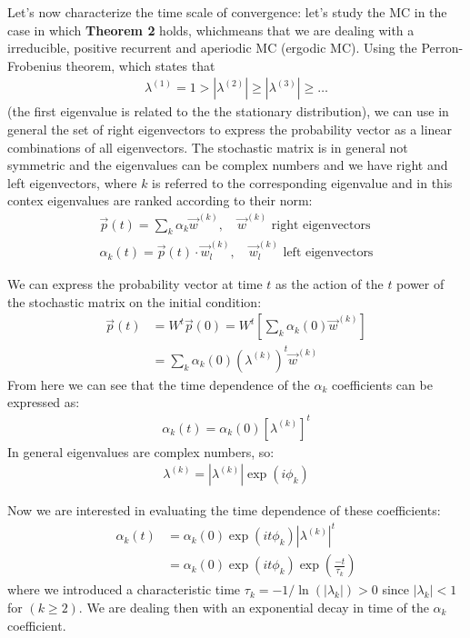 \documentclass[\main/main.tex]{subfiles}
\begin{document}
Let's now characterize the time scale of convergence: let's study the MC in the case in which \textbf{Theorem 2} holds, whichmeans that we are dealing with a irreducible, positive recurrent and aperiodic MC (ergodic MC).
Using the Perron-Frobenius theorem, which states that
\begin{eqnarray}
\lambda^{(1)}=1>|\lambda^{(2)}|\geq|\lambda^{(3)}|\geq\dots
\end{eqnarray}
(the first eigenvalue is related to the the stationary distribution), we can use in general the set of right eigenvectors to express the probability vector as a linear combinations of all eigenvectors. The stochastic matrix is in general not symmetric and the eigenvalues can be complex numbers and we have right and left eigenvectors, where $k$ is referred to the corresponding eigenvalue and in this contex eigenvalues are ranked according to their norm:
\begin{eqnarray}
\Vec{p}(t)=\sum_k \alpha_k \Vec{w}^{(k)}, \quad \vec{w}^{(k)}\,\, \text{right eigenvectors} \\
\alpha_k(t)=\Vec{p}(t)\cdot\Vec{w}_l^{(k)}, \quad \Vec{w}_l^{(k)}\,\,\text{left eigenvectors}
\end{eqnarray}

We can express the probability vector at time $t$ as the action of the $t$ power of the stochastic matrix on the initial condition:
\begin{align}
    \Vec{p}(t) &=W^t \Vec{p}(0)=W^t[\sum_k \alpha_k(0)\Vec{w}^{(k)}] \\
    &=\sum_k \alpha_k(0) (\lambda^{(k)})^{t}\Vec{w}^{(k)}
\end{align}
From here we can see that the time dependence of the $\alpha_k$ coefficients can be expressed as:
\begin{eqnarray}
    \alpha_k(t)=\alpha_k(0)[\lambda^{(k)}]^t
\end{eqnarray}
In general eigenvalues are complex numbers, so:
\begin{eqnarray}
       \lambda^{(k)}=|\lambda^{(k)}|\exp(i \phi_k)
\end{eqnarray}

Now we are interested in evaluating the time dependence of these coefficients:
\begin{align}
    \alpha_k(t)&=\alpha_k(0)\exp(i t \phi_k)|\lambda^{(k)}|^t \\
    &=\alpha_k(0) \exp(it\phi_k)\exp(\frac{-t}{\tau_k})
\end{align}
where we introduced a characteristic time $\tau_k=-1/\ln(|\lambda_k|)>0$ since  $|\lambda_k|<1$ for $ (k\geq 2)$.
We are dealing then with an exponential decay in time of the $\alpha_k$ coefficient.
\end{document}
